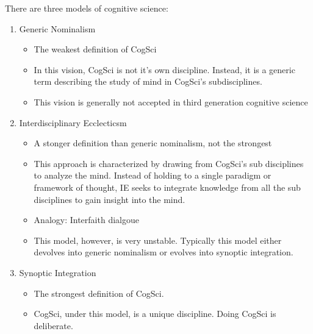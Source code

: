 \documentclass[twoside]{article}
\begin{document}
There are three models of cognitive science:
\begin{enumerate}
  \item Generic Nominalism
    \begin{itemize}
      \item The weakest definition of CogSci
      \item In this vision, CogSci is not it's own discipline. Instead, it is
            a generic term describing the study of mind in CogSci's subdisciplines.
      \item This vision is generally not accepted in third generation cognitive science
    \end{itemize}
  \item Interdisciplinary Ecclecticsm
  \begin{itemize}
    \item A stonger definition than generic nominalism, not the strongest
    \item This approach is characterized by drawing from CogSci's sub disciplines
          to analyze the mind. Instead of holding to a single paradigm or framework
          of thought, IE seeks to integrate knowledge from all the sub disciplines to
          gain insight into the mind.
    \item Analogy: Interfaith dialgoue
    \item This model, however, is very unstable. Typically this model either devolves
          into generic nominalism or evolves into synoptic integration.
  \end{itemize}
  \item Synoptic Integration
  \begin{itemize}
    \item The strongest definition of CogSci.
    \item CogSci, under this model, is a unique discipline. Doing CogSci is deliberate.
  \end{itemize}
\end{enumerate}
\end{document}
